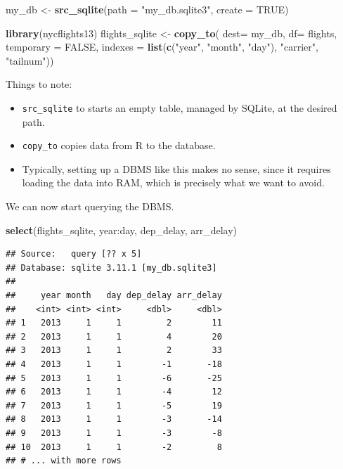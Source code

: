\documentclass[]{book}
\newenvironment{Shaded}{\begin{snugshade}}{\end{snugshade}}
\newcommand{\KeywordTok}[1]{\textcolor[rgb]{0.13,0.29,0.53}{\textbf{{#1}}}}
\newcommand{\DataTypeTok}[1]{\textcolor[rgb]{0.13,0.29,0.53}{{#1}}}
\newcommand{\StringTok}[1]{\textcolor[rgb]{0.31,0.60,0.02}{{#1}}}
\newcommand{\OtherTok}[1]{\textcolor[rgb]{0.56,0.35,0.01}{{#1}}}
\newcommand{\NormalTok}[1]{{#1}}
\providecommand{\tightlist}{%
  \setlength{\itemsep}{0pt}\setlength{\parskip}{0pt}}
\theoremstyle{definition}
\theoremstyle{definition}
\theoremstyle{remark}
\begin{document}
\begin{Shaded}
\begin{Highlighting}[]
\NormalTok{my_db <-}\StringTok{ }\KeywordTok{src_sqlite}\NormalTok{(}\DataTypeTok{path =} \StringTok{"my_db.sqlite3"}\NormalTok{, }\DataTypeTok{create =} \OtherTok{TRUE}\NormalTok{)}

\KeywordTok{library}\NormalTok{(nycflights13)}
\NormalTok{flights_sqlite <-}\StringTok{ }\KeywordTok{copy_to}\NormalTok{(}
  \DataTypeTok{dest=} \NormalTok{my_db, }
  \DataTypeTok{df=} \NormalTok{flights, }
  \DataTypeTok{temporary =} \OtherTok{FALSE}\NormalTok{, }
  \DataTypeTok{indexes =} \KeywordTok{list}\NormalTok{(}\KeywordTok{c}\NormalTok{(}\StringTok{"year"}\NormalTok{, }\StringTok{"month"}\NormalTok{, }\StringTok{"day"}\NormalTok{), }\StringTok{"carrier"}\NormalTok{, }\StringTok{"tailnum"}\NormalTok{))}
\end{Highlighting}
\end{Shaded}

Things to note:

\begin{itemize}
\tightlist
\item
  \texttt{src\_sqlite} to starts an empty table, managed by SQLite, at
  the desired path.
\item
  \texttt{copy\_to} copies data from R to the database.
\item
  Typically, setting up a DBMS like this makes no sense, since it
  requires loading the data into RAM, which is precisely what we want to
  avoid.
\end{itemize}

We can now start querying the DBMS.

\begin{Shaded}
\begin{Highlighting}[]
\KeywordTok{select}\NormalTok{(flights_sqlite, year:day, dep_delay, arr_delay)}
\end{Highlighting}
\end{Shaded}

\begin{verbatim}
## Source:   query [?? x 5]
## Database: sqlite 3.11.1 [my_db.sqlite3]
## 
##     year month   day dep_delay arr_delay
##    <int> <int> <int>     <dbl>     <dbl>
## 1   2013     1     1         2        11
## 2   2013     1     1         4        20
## 3   2013     1     1         2        33
## 4   2013     1     1        -1       -18
## 5   2013     1     1        -6       -25
## 6   2013     1     1        -4        12
## 7   2013     1     1        -5        19
## 8   2013     1     1        -3       -14
## 9   2013     1     1        -3        -8
## 10  2013     1     1        -2         8
## # ... with more rows
\end{verbatim}
\end{document}
